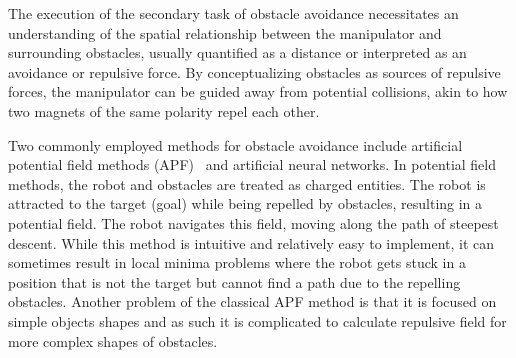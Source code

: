 \documentclass[a4paper]{article}
\begin{document}
%
%
%

The execution of the secondary task of obstacle avoidance necessitates an understanding of the spatial relationship between the manipulator and surrounding obstacles, usually quantified as a distance or interpreted as an avoidance or repulsive force. By conceptualizing obstacles as sources of repulsive forces, the manipulator can be guided away from potential collisions, akin to how two magnets of the same polarity repel each other.

Two commonly employed methods for obstacle avoidance include artificial potential field methods (APF)~\cite{Khatib1985} and artificial neural networks. In potential field methods, the robot and obstacles are treated as charged entities. The robot is attracted to the target (goal) while being repelled by obstacles, resulting in a potential field. The robot navigates this field, moving along the path of steepest descent. While this method is intuitive and relatively easy to implement, it can sometimes result in local minima problems where the robot gets stuck in a position that is not the target but cannot find a path due to the repelling obstacles. Another problem of the classical APF method is that it is focused on simple objects shapes and as such it is complicated to calculate repulsive field for more complex shapes of obstacles.
\end{document}
